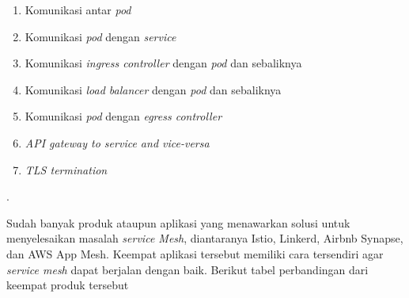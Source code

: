 \begin{enumerate}
  \item Komunikasi antar \textit{pod}
  \item Komunikasi \textit{pod} dengan \textit{service}
  \item Komunikasi \textit{ingress controller} dengan \textit{pod} dan sebaliknya
  \item Komunikasi \textit{load balancer} dengan \textit{pod} dan sebaliknya
  \item Komunikasi \textit{pod} dengan \textit{egress controller}
  \item \textit{API gateway to service and vice-versa}
  \item \textit{TLS termination}
\end{enumerate}.

Sudah banyak produk ataupun aplikasi yang menawarkan solusi untuk menyelesaikan masalah \textit{\textit{service} Mesh}, diantaranya Istio, Linkerd, Airbnb Synapse, dan AWS App Mesh. Keempat aplikasi tersebut memiliki cara tersendiri agar \textit{\textit{service} mesh} dapat berjalan dengan baik. Berikut tabel perbandingan dari keempat produk tersebut


